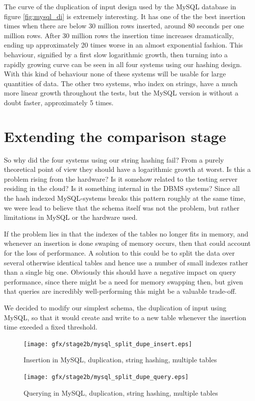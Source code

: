 The curve of the duplication of input design used by the MySQL database in figure \ref{fig:mysql_di} is extremely interesting. It has one of the the best insertion times when there are below 30 million rows inserted, around 80 seconds per one million rows. After 30 million rows the insertion time increases dramatically, ending up approximately 20 times worse in an almost exponential fashion. This behaviour, signified by a first slow logarithmic growth, then turning into a rapidly growing curve can be seen in all four systems using our hashing design. With this kind of behaviour none of these systems will be usable for large quantities of data. The other two systems, who index on strings, have a much more linear growth throughout the tests, but the MySQL version is without a doubt faster, approximately 5 times.

\section{Extending the comparison stage}
So why did the four systems using our string hashing fail? From a purely theoretical point of view they should have a logarithmic growth at worst. Is this a problem rising from the hardware? Is it somehow related to the testing server residing in the cloud? Is it something internal in the DBMS systems? Since all the hash indexed MySQL-systems breaks this pattern roughly at the same time, we were lead to believe that the schema itself was not the problem, but rather limitations in MySQL or the hardware used.

If the problem lies in that the indexes of the tables no longer fits in memory, and whenever an insertion is done swaping of memory occurs, then that could account for the loss of performance. A solution to this could be to split the data over several otherwise identical tables and hence use a number of small indexes rather than a single big one. Obviously this should have a negative impact on query performance, since there might be a need for memory swapping then, but given that queries are incredibly well-performing this might be a valuable trade-off.

We decided to modify our simplest schema, the duplication of input using MySQL, so that it would create and write to a new table whenever the insertion time exeeded a fixed threshold.

\clearpage
\begin{figure}
    \centering
    \texttt{[image: gfx/stage2b/mysql\_split\_dupe\_insert.eps]}
    \caption{Insertion in MySQL, duplication, string hashing, multiple tables}
    \label{fig:mysql_sdi2}
\end{figure}
\begin{figure} 
    \centering
    \texttt{[image: gfx/stage2b/mysql\_split\_dupe\_query.eps]}
    \caption{Querying in MySQL, duplication, string hashing, multiple tables}
    \label{fig:mysql_sdq2}
\end{figure}
\clearpage


